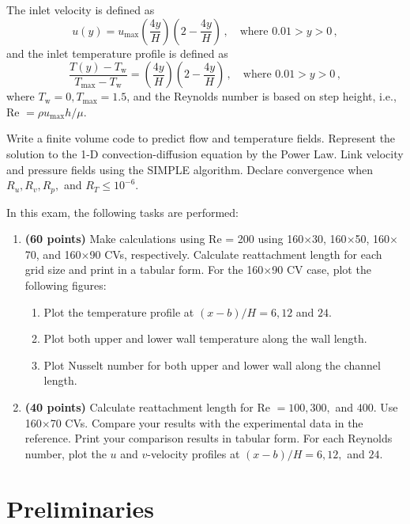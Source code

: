\documentclass{article}
\begin{document}
The inlet velocity is defined as
\[
	u(y) = u_\mathrm{max} \left(\frac{4y}{H}\right) \left(2 - \frac{4y}{H}\right)\,, \quad \text{where } 0.01 > y > 0\,,
\]
and the inlet temperature profile is defined as
\[
	\frac{T(y) - T_\mathrm{w}}{T_\mathrm{max} - T_\mathrm{w}} = \left(\frac{4y}{H}\right) \left(2 - \frac{4y}{H}\right)\,, \quad \text{where } 0.01 > y > 0\,,
\]
where $T_\mathrm{w} = 0, T_\mathrm{max} = 1.5$, and the Reynolds number is based on step height, i.e., Re $=\rho u_\mathrm{max} h/\mu$.

Write a finite volume code to predict flow and temperature fields. Represent the solution to the 1-D convection-diffusion equation by the Power Law. Link velocity and pressure fields using the SIMPLE algorithm. Declare convergence when $R_u, R_v, R_p,$ and $R_T \leq 10^{-6}$.

In this exam, the following tasks are performed:
\begin{enumerate}
	\item \textbf{(60 points)} Make calculations using Re = 200 using 160$\times$30, 160$\times$50, 160$\times$70, and 160$\times$90 CVs, respectively. Calculate reattachment length for each grid size and print in a tabular form. For the 160$\times$90 CV case, plot the following figures:
	\begin{enumerate}[label=(\alph*)]
		\item Plot the temperature profile at $(x - b)/H = 6, 12$ and $24$.
		\item Plot both upper and lower wall temperature along the wall length.
		\item Plot Nusselt number for both upper and lower wall along the channel length.
	\end{enumerate}
	\item \textbf{(40 points)} Calculate reattachment length for Re $= 100, 300,$ and $400$. Use 160$\times$70 CVs. Compare your results with the experimental data in the reference. Print your comparison results in tabular form. For each Reynolds number, plot the $u$ and $v$-velocity profiles at $(x - b)/H = 6, 12,$ and $24$.
\end{enumerate}

\section{Preliminaries}
\end{document}

